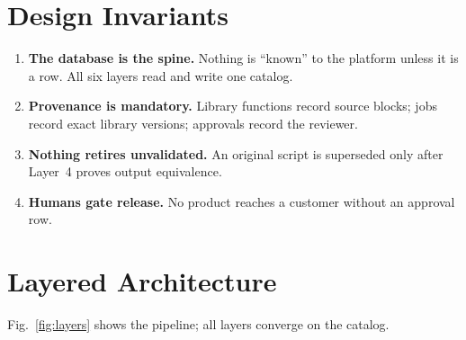 \documentclass[conference]{IEEEtran}
\begin{document}
\section{Design Invariants}
\begin{enumerate}
\item \textbf{The database is the spine.} Nothing is ``known'' to the platform unless it is a row. All six layers read and write one catalog.
\item \textbf{Provenance is mandatory.} Library functions record source blocks; jobs record exact library versions; approvals record the reviewer.
\item \textbf{Nothing retires unvalidated.} An original script is superseded only after Layer~4 proves output equivalence.
\item \textbf{Humans gate release.} No product reaches a customer without an approval row.
\end{enumerate}

\section{Layered Architecture}
Fig.~\ref{fig:layers} shows the pipeline; all layers converge on the catalog.
\end{document}
